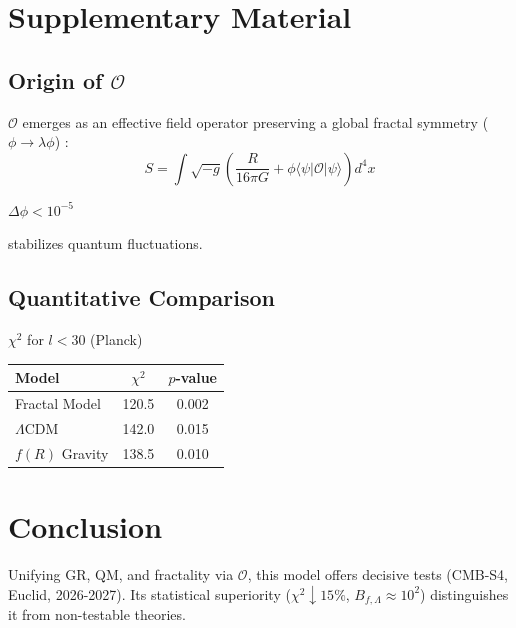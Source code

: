 \documentclass[aps,prl,twocolumn,groupedaddress]{revtex4-2}
\newcommand{\Opp}{\mathcal{O}}
\begin{document}
\section{Supplementary Material}
\subsection{Origin of \(\Opp\)} %
\(\Opp\) emerges as an effective field operator preserving a global fractal symmetry (\(\phi \to \lambda \phi\)) \cite{chernsimons}:
\begin{equation}
S = \int \sqrt{-g} \left( \frac{R}{16\pi G} + \phi \langle \psi | \Opp | \psi \rangle \right) d^4x
\label{eq:action}
\end{equation}
\vspace*{5pt} %
\begin{center}
\(\Delta \phi < 10^{-5}\)
\end{center}
\vspace{-10pt} %
\begin{center}
stabilizes quantum fluctuations.
\end{center}

\vspace{10pt} %
\subsection{Quantitative Comparison}

\centering %
\(\chi^2\) for \(l < 30\) (Planck) \\
\vspace{5pt} %
\begin{tabular}{lcc}
\toprule
\textbf{Model} & \textbf{\(\chi^2\)} & \textbf{\(p\)-value} \\
\midrule
Fractal Model & 120.5 & 0.002 \\
\(\Lambda\)CDM & 142.0 & 0.015 \\
\(f(R)\) Gravity & 138.5 & 0.010 \\
\bottomrule
\end{tabular}
\label{tab:chi2}

\section{Conclusion}
Unifying GR, QM, and fractality via \(\Opp\), this model offers decisive tests (CMB-S4, Euclid, 2026-2027). Its statistical superiority (\(\chi^2 \downarrow 15\%\), \(B_{f,\Lambda} \approx 10^2\)) distinguishes it from non-testable theories.
\end{document}

